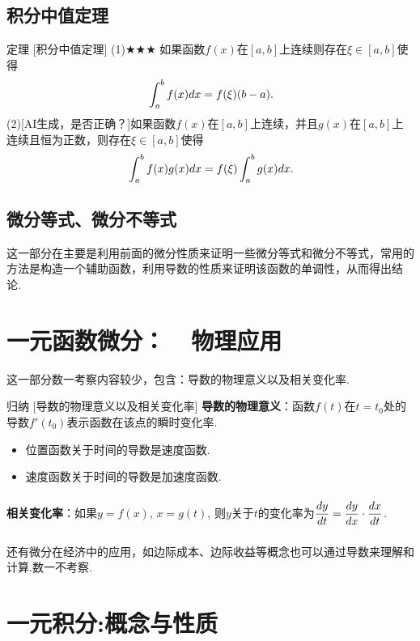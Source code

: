 \documentclass[a4paper,12pt,oneside,fontset=none]{ctexbook}
\let\olddfrac\dfrac
\renewcommand{\dfrac}[2]{
    \olddfrac{#1\vrule width 0pt height 1.15em depth 0em}{#2\vrule width 0pt height 0em depth 0.6em}
}
\let\oldint\int
\renewcommand{\int}{\displaystyle{\vrule width 0pt height 0em depth 0em}\oldint}
\newcounter{theorem}[chapter]
\newenvironment{theorem}[1][]{\begin{thmBox}{定理}{#1}}{\end{thmBox}}
\newenvironment{induction}[1][]{\begin{thmBox}{归纳}{#1}}{\end{thmBox}}
\numberwithin{equation}{chapter}
\begin{document}
\section{积分中值定理}
\begin{theorem}
    [积分中值定理]
    (1)$\bigstar\bigstar\bigstar$
    如果函数$f(x)$在$[a,b]$上连续则存在$\xi\in[a,b]$使得
    \[
        \int_a^b f(x) dx = f(\xi)(b-a).
    \]
    (2)[AI生成，是否正确？]如果函数$f(x)$在$[a,b]$上连续，并且$g(x)$在$[a,b]$上连续且恒为正数，则存在$\xi\in[a,b]$使得
    \[
        \int_a^b f(x)g(x) dx = f(\xi)\int_a^b g(x) dx.  
    \]
\end{theorem}


\section{微分等式、微分不等式}
这一部分在主要是利用前面的微分性质来证明一些微分等式和微分不等式，常用的方法是构造一个辅助函数，利用导数的性质来证明该函数的单调性，从而得出结论.


\chapter{一元函数微分：\ \ 物理应用}
这一部分数一考察内容较少，包含：导数的物理意义以及相关变化率.
\begin{induction}
    [导数的物理意义以及相关变化率]
    \textbf{导数的物理意义}：函数$f(t)$在$t=t_0$处的导数$f'(t_0)$表示函数在该点的瞬时变化率.
    \begin{itemize}
        \item 位置函数关于时间的导数是速度函数.
        \item 速度函数关于时间的导数是加速度函数.
    \end{itemize}
    \textbf{相关变化率}：如果$y=f(x)$, $x=g(t)$, 则$y$关于$t$的变化率为$\dfrac{dy}{dt} = \dfrac{dy}{dx} \cdot \dfrac{dx}{dt}$.
\end{induction}
还有微分在经济中的应用，如边际成本、边际收益等概念也可以通过导数来理解和计算.数一不考察.



\chapter{一元积分:概念与性质}
\end{document}
